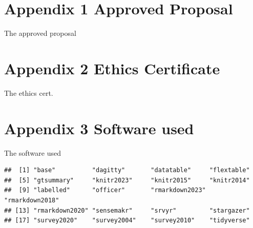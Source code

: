 \documentclass[
]{article}
\begin{document}
\hypertarget{appendix-1-approved-proposal}{%
\section{Appendix 1 Approved
Proposal}\label{appendix-1-approved-proposal}}

The approved proposal

\hypertarget{appendix-2-ethics-certificate}{%
\section{Appendix 2 Ethics
Certificate}\label{appendix-2-ethics-certificate}}

The ethics cert.

\hypertarget{appendix-3-software-used}{%
\section{Appendix 3 Software used}\label{appendix-3-software-used}}

The software used

\begin{verbatim}
##  [1] "base"          "dagitty"       "datatable"     "flextable"    
##  [5] "gtsummary"     "knitr2023"     "knitr2015"     "knitr2014"    
##  [9] "labelled"      "officer"       "rmarkdown2023" "rmarkdown2018"
## [13] "rmarkdown2020" "sensemakr"     "srvyr"         "stargazer"    
## [17] "survey2020"    "survey2004"    "survey2010"    "tidyverse"
\end{verbatim}
\end{document}
